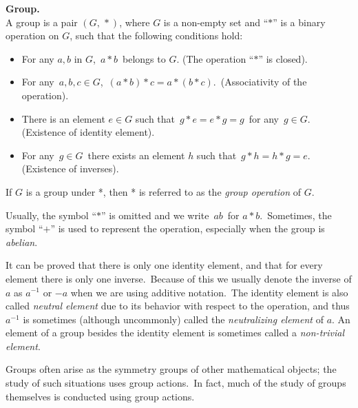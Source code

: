 \documentclass[12pt]{article}
\begin{document}
\textbf{Group.}\\
A group is a pair $(G,\,*)$, where $G$ is a non-empty set and ``$*$''
is a binary operation on $G$, such that the following conditions hold:

\begin{itemize}
\item For any $a,b$ in $G$, \,$a*b$\, belongs to $G$. (The operation
``$*$'' is closed).

\item For any \,$a,b,c\in G$, \,$(a*b)*c=a*(b*c)$. \,(Associativity of
the operation).

\item There is an element $e\in G$ such that \,$g*e=e*g=g$\, for any
\,$g\in G$. (Existence of identity element).

\item For any \,$g\in G$\, there exists an element $h$ such that
\,$g*h=h*g=e$. \,(Existence of inverses).
\end{itemize}

If $G$ is a group under *, then * is referred to as the \emph{group
operation} of $G$.

Usually, the symbol ``$*$'' is omitted and we write \,$ab$\, for
$a*b$. \,Sometimes, the symbol ``$+$'' is used to represent the
operation, especially when the group is \emph{abelian}.

It can be proved that there is only one identity element, and that for
every element there is only one inverse. \,Because of this we usually
denote the inverse of $a$ as $a^{-1}$ or $-a$ when we are using
additive notation. \,The identity element is also called \emph{neutral
element} due to its behavior with respect to the operation, and thus
$a^{-1}$ is sometimes (although uncommonly) called the {\em
neutralizing element} of $a$.  An element of a group besides the
identity element is sometimes called a \emph{non-trivial element}.

Groups often arise as the symmetry groups of other mathematical objects; the study of such situations uses group actions. \,In fact, much of the study of groups themselves is conducted using group actions.
\end{document}
